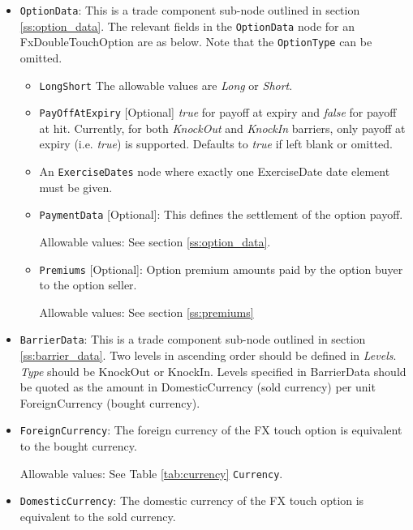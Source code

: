 \begin{itemize}

\item \lstinline!OptionData!: This is a trade component sub-node outlined in section \ref{ss:option_data}. 
The relevant fields in the \lstinline!OptionData! node for an FxDoubleTouchOption are as below. Note that the \lstinline!OptionType! can be omitted.

\begin{itemize}
\item \lstinline!LongShort! The allowable values are \emph{Long} or \emph{Short}.

\item  \lstinline!PayOffAtExpiry! [Optional] \emph{true} for payoff at expiry and \emph{false} for payoff at hit.
Currently, for both \emph{KnockOut} and \emph{KnockIn} barriers, only payoff at expiry (i.e. \emph{true}) is supported. Defaults to  \emph{true} if left blank or omitted.

\item An \lstinline!ExerciseDates! node where exactly one ExerciseDate date element must be given.

\item \lstinline!PaymentData! [Optional]: This defines the settlement of the option payoff.

Allowable values: See section \ref{ss:option_data}.

\item \lstinline!Premiums! [Optional]: Option premium amounts paid by the option buyer to the option seller.

Allowable values:  See section \ref{ss:premiums}

\end{itemize}

\item \lstinline!BarrierData!: This is a trade component sub-node outlined in section \ref{ss:barrier_data}.
Two levels in ascending order should be defined in \emph{Levels}. \emph{Type} should be KnockOut or KnockIn. Levels specified in BarrierData should be quoted as the amount in DomesticCurrency (sold currency) per unit ForeignCurrency (bought currency).


\item \lstinline!ForeignCurrency!: The foreign currency of the FX touch option is equivalent to the bought currency.  

Allowable values:  See Table \ref{tab:currency} \lstinline!Currency!.

\item \lstinline!DomesticCurrency!: The domestic currency of the FX touch option is equivalent to the sold currency. 


\end{itemize}
